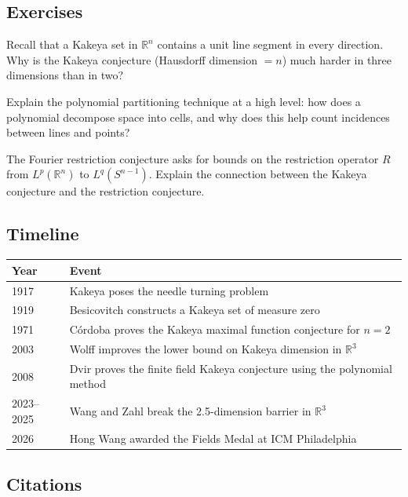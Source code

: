 \subsection{Exercises}

\begin{exercise}[Basic]
Recall that a Kakeya set in $\mathbb{R}^n$ contains a unit line segment in every direction. Why is the Kakeya conjecture (Hausdorff dimension $= n$) much harder in three dimensions than in two?
\end{exercise}

\begin{exercise}[Intermediate]
Explain the polynomial partitioning technique at a high level: how does a polynomial decompose space into cells, and why does this help count incidences between lines and points?
\end{exercise}

\begin{exercise}[Challenge]
The Fourier restriction conjecture asks for bounds on the restriction operator $R$ from $L^p(\mathbb{R}^n)$ to $L^q(S^{n-1})$. Explain the connection between the Kakeya conjecture and the restriction conjecture.
\end{exercise}

\subsection{Timeline}

\begin{tabularx}{\linewidth}{lX}
\toprule
\textbf{Year} & \textbf{Event} \\ \midrule
1917 & Kakeya poses the needle turning problem \\
1919 & Besicovitch constructs a Kakeya set of measure zero \\
1971 & Córdoba proves the Kakeya maximal function conjecture for $n=2$ \\
2003 & Wolff improves the lower bound on Kakeya dimension in $\mathbb{R}^3$ \\
2008 & Dvir proves the finite field Kakeya conjecture using the polynomial method \\
2023--2025 & Wang and Zahl break the 2.5-dimension barrier in $\mathbb{R}^3$ \\
2026 & Hong Wang awarded the Fields Medal at ICM Philadelphia \\
\bottomrule
\end{tabularx}

\subsection{Citations}


